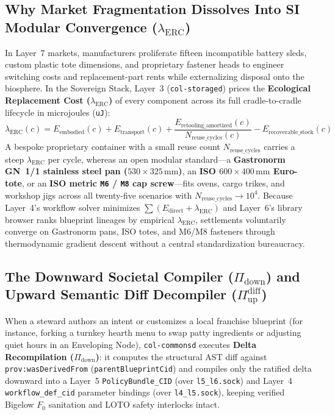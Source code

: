 \subsection{Why Market Fragmentation Dissolves Into SI Modular Convergence ($\lambda_{\mathrm{ERC}}$)}

In Layer~7 markets, manufacturers proliferate fifteen incompatible battery sleds, custom plastic tote dimensions, and proprietary fastener heads to engineer switching costs and replacement-part rents while externalizing disposal onto the biosphere. In the Sovereign Stack, Layer~3 (\texttt{col-storaged}) prices the \textbf{Ecological Replacement Cost ($\lambda_{\mathrm{ERC}}$)} of every component across its full cradle-to-cradle lifecycle in microjoules (\texttt{uJ}):
\begin{equation}
    \lambda_{\mathrm{ERC}}(c) = E_{\mathrm{embodied}}(c) + E_{\mathrm{transport}}(c) + \frac{E_{\mathrm{retooling\_amortized}}(c)}{N_{\mathrm{reuse\_cycles}}(c)} - E_{\mathrm{recoverable\_stock}}(c)
    \label{eq:ch2-erc-convergence}
\end{equation}
A bespoke proprietary container with a small reuse count $N_{\mathrm{reuse\_cycles}}$ carries a steep $\lambda_{\mathrm{ERC}}$ per cycle, whereas an open modular standard---a \textbf{Gastronorm GN~1/1 stainless steel pan ($530 \times 325\,\mathrm{mm}$)}, an \textbf{ISO $600 \times 400\,\mathrm{mm}$ Euro-tote}, or an \textbf{ISO metric \texttt{M6} / \texttt{M8} cap screw}---fits ovens, cargo trikes, and workshop jigs across all twenty-five scenarios with $N_{\mathrm{reuse\_cycles}} \to 10^4$. Because Layer~4's workflow solver minimizes $\sum (E_{\mathrm{direct}} + \lambda_{\mathrm{ERC}})$ and Layer~6's library browser ranks blueprint lineages by empirical $\lambda_{\mathrm{ERC}}$, settlements voluntarily converge on Gastronorm pans, ISO totes, and M6/M8 fasteners through thermodynamic gradient descent without a central standardization bureaucracy.

\subsection{The Downward Societal Compiler ($\Pi_{\mathrm{down}}$) and Upward Semantic Diff Decompiler ($\Pi_{\mathrm{up}}^{\mathrm{diff}}$)}
\label{subsec:compiler-decompiler}

When a steward authors an intent or customizes a local franchise blueprint (for instance, forking a turnkey hearth menu to swap patty ingredients or adjusting quiet hours in an Enveloping Node), \texttt{col-commonsd} executes \textbf{Delta Recompilation ($\Pi_{\mathrm{down}}$)}: it computes the structural AST diff against \texttt{prov:wasDerivedFrom} (\texttt{parentBlueprintCid}) and compiles only the ratified delta downward into a Layer~5 \texttt{PolicyBundle\_CID} (over \texttt{l5\_l6.sock}) and Layer~4 \texttt{workflow\_def\_cid} parameter bindings (over \texttt{l4\_l5.sock}), keeping verified Bigelow $F_0$ sanitation and LOTO safety interlocks intact.

